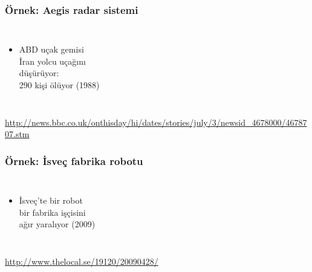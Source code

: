\documentclass[dvipsnames]{beamer}
\theoremstyle{definition}
\theoremstyle{example}
\theoremstyle{plain}
\begin{document}
\begin{frame}
  \frametitle{Örnek: Aegis radar sistemi}

  \begin{columns}

    \begin{itemize}
      \item ABD uçak gemisi\\
        İran yolcu uçağını\\
        düşürüyor:\\
        290 kişi ölüyor (1988)
    \end{itemize}
  \end{columns}

  \medskip
  \tiny{\url{http://news.bbc.co.uk/onthisday/hi/dates/stories/july/3/newsid_4678000/4678707.stm}}\\
\end{frame}

\begin{frame}
  \frametitle{Örnek: İsveç fabrika robotu}

  \begin{columns}

    \begin{itemize}
      \item İsveç'te bir robot\\
        bir fabrika işçisini\\
        ağır yaralıyor (2009)
    \end{itemize}
  \end{columns}

  \medskip
  \tiny{\url{http://www.thelocal.se/19120/20090428/}}\\
\end{frame}
\end{document}
